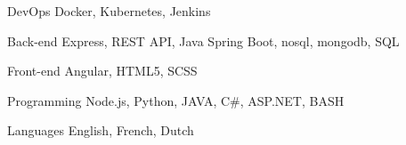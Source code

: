 

\begin{cvskills}

  \cvskill
    {DevOps} %
    {Docker, Kubernetes, Jenkins} %

  \cvskill
    {Back-end} %
    {Express, REST API, Java Spring Boot, nosql, mongodb, SQL} %

  \cvskill
    {Front-end} %
    {Angular, HTML5, SCSS} %

  \cvskill
    {Programming} %
    {Node.js, Python, JAVA, C\#, ASP.NET, BASH} %

  \cvskill
    {Languages} %
    {English, French, Dutch} %

\end{cvskills}
